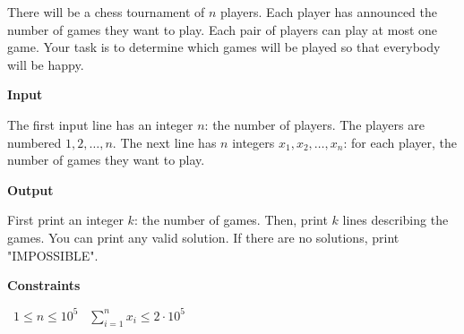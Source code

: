 There will be a chess tournament of $n$ players. Each player has announced the number of games they want to play.
Each pair of players can play at most one game. Your task is to determine which games will be played so that everybody will be happy.

\vspace{0.3cm}\noindent\textbf{Input}

The first input line has an integer $n$: the number of players. The players are numbered $1,2,\dots,n$.
The next line has $n$ integers $x_1,x_2,\dots,x_n$: for each player, the number of games they want to play.

\vspace{0.3cm}\noindent\textbf{Output}

First print an integer $k$: the number of games. Then, print $k$ lines describing the games. You can print any valid solution.
If there are no solutions, print "IMPOSSIBLE".

\vspace{0.3cm}\noindent\textbf{Constraints}

\textbullet\ $1 \le n \le 10^5$
\textbullet\ $\sum_{i=1}^{n} x_i \le 2 \cdot 10^5$